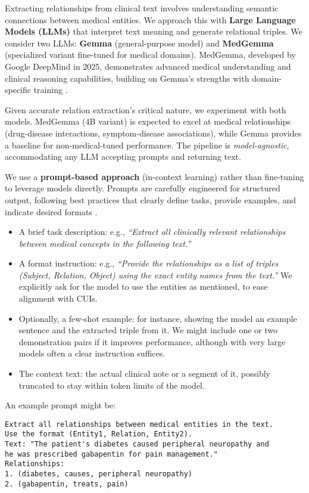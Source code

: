 Extracting relationships from clinical text involves understanding semantic connections between medical entities. We approach this with \textbf{Large Language Models (LLMs)} that interpret text meaning and generate relational triples. We consider two LLMs: \textbf{Gemma} (general-purpose model) and \textbf{MedGemma} (specialized variant fine-tuned for medical domains). MedGemma, developed by Google DeepMind in 2025, demonstrates advanced medical understanding and clinical reasoning capabilities, building on Gemma's strengths with domain-specific training \parencite{MedGemma2025,Gemma2025}.

Given accurate relation extraction's critical nature, we experiment with both models. MedGemma (4B variant) is expected to excel at medical relationships (drug-disease interactions, symptom-disease associations), while Gemma provides a baseline for non-medical-tuned performance. The pipeline is \textit{model-agnostic}, accommodating any LLM accepting prompts and returning text.

We use a \textbf{prompt-based approach} (in-context learning) rather than fine-tuning to leverage models directly. Prompts are carefully engineered for structured output, following best practices that clearly define tasks, provide examples, and indicate desired formats \parencite{Reynolds2021}.

\begin{itemize}
\item A brief task description: e.g., \textit{``Extract all clinically relevant relationships between medical concepts in the following text.''}
\item A format instruction: e.g., \textit{``Provide the relationships as a list of triples (Subject, Relation, Object) using the exact entity names from the text.''} We explicitly ask for the model to use the entities as mentioned, to ease alignment with CUIs.
\item Optionally, a few-shot example: for instance, showing the model an example sentence and the extracted triple from it. We might include one or two demonstration pairs if it improves performance, although with very large models often a clear instruction suffices.
\item The context text: the actual clinical note or a segment of it, possibly truncated to stay within token limits of the model.
\end{itemize}

An example prompt might be:

\begin{verbatim}
Extract all relationships between medical entities in the text. 
Use the format (Entity1, Relation, Entity2).
Text: "The patient's diabetes caused peripheral neuropathy and 
he was prescribed gabapentin for pain management."
Relationships:
1. (diabetes, causes, peripheral neuropathy)
2. (gabapentin, treats, pain)
\end{verbatim}

